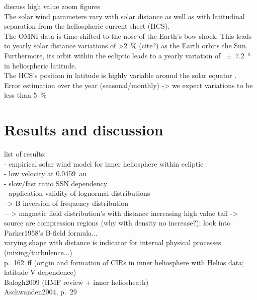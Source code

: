 discuss high value zoom figures\\

The solar wind parameters vary with solar distance as well as with latitudinal separation from the heliospheric current sheet (HCS).\\
The OMNI data is time-shifted to the nose of the Earth's bow shock. This leads to yearly solar distance variations of \SI{>2}{\percent} (cite?) as the Earth orbits the Sun. Furthermore, its orbit within the ecliptic leads to a yearly variation of \SI{+-7.2}{\degree} in heliospheric latitude.\\
The HCS's position in latitude is highly variable around the solar equator \citep[p.~127~ff.?]{Schwenn1990}.\\

Error estimation over the year (seasonal/monthly) -> we expect variations to be less than 5~\%\\





\section{Results and discussion}

list of results:\\
- empirical solar wind model for inner heliosphere within ecliptic\\
- low velocity at 0.0459~au\\
- slow/fast ratio SSN dependency\\
- application validity of lognormal distributions\\
--> B inversion of frequency distribution\\
---> magnetic field distribution's with distance increasing high value tail -> source are compression regions (why with density no increase?); look into Parker1958's B-field formula...\\
varying shape with distance is indicator for internal physical processes (mixing/turbulence...)\\

\citet{Balogh1999} p.~162~ff (origin and formation of CIRs in inner heliosphere with Helios data; latitude V dependence)\\
Balogh2009 (HMF review + inner heliosheath)\\
Aschwanden2004, p.~29\\

